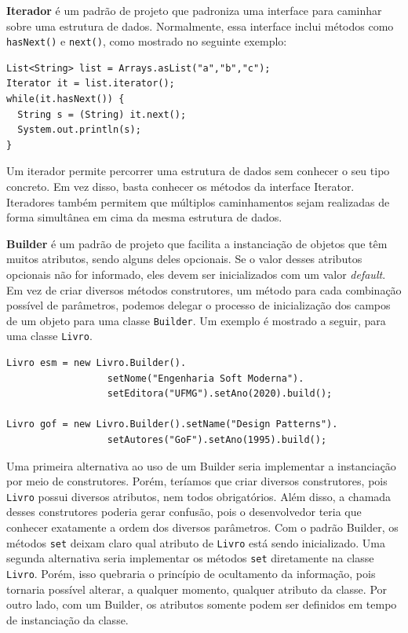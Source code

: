 \documentclass[
  11pt,
  twoside]{book}
\newcommand{\passthrough}[1]{#1}
\begin{document}
\textbf{Iterador} é um padrão de projeto que padroniza uma interface
para caminhar sobre uma estrutura de dados. Normalmente, essa interface
inclui métodos como \passthrough{\lstinline!hasNext()!} e
\passthrough{\lstinline!next()!}, como mostrado no seguinte exemplo:

\newpage

\begin{lstlisting}
List<String> list = Arrays.asList("a","b","c");
Iterator it = list.iterator();
while(it.hasNext()) {
  String s = (String) it.next();
  System.out.println(s);
}
\end{lstlisting}

Um iterador permite percorrer uma estrutura de dados sem conhecer o seu
tipo concreto. Em vez disso, basta conhecer os métodos da interface
Iterator. Iteradores também permitem que múltiplos caminhamentos sejam
realizadas de forma simultânea em cima da mesma estrutura de dados.

 

\textbf{Builder} é um padrão de projeto que facilita a instanciação de
objetos que têm muitos atributos, sendo alguns deles opcionais. Se o
valor desses atributos opcionais não for informado, eles devem ser
inicializados com um valor \emph{default}. Em vez de criar diversos
métodos construtores, um método para cada combinação possível de
parâmetros, podemos delegar o processo de inicialização dos campos de um
objeto para uma classe \passthrough{\lstinline!Builder!}. Um exemplo é
mostrado a seguir, para uma classe \passthrough{\lstinline!Livro!}.

\begin{lstlisting}
Livro esm = new Livro.Builder().
                  setNome("Engenharia Soft Moderna").
                  setEditora("UFMG").setAno(2020).build();

Livro gof = new Livro.Builder().setName("Design Patterns").
                  setAutores("GoF").setAno(1995).build();
\end{lstlisting}

Uma primeira alternativa ao uso de um Builder seria implementar a
instanciação por meio de construtores. Porém, teríamos que criar
diversos construtores, pois \passthrough{\lstinline!Livro!} possui
diversos atributos, nem todos obrigatórios. Além disso, a chamada desses
construtores poderia gerar confusão, pois o desenvolvedor teria que
conhecer exatamente a ordem dos diversos parâmetros. Com o padrão
Builder, os métodos \passthrough{\lstinline!set!} deixam claro qual
atributo de \passthrough{\lstinline!Livro!} está sendo inicializado. Uma
segunda alternativa seria implementar os métodos
\passthrough{\lstinline!set!} diretamente na classe
\passthrough{\lstinline!Livro!}. Porém, isso quebraria o princípio de
ocultamento da informação, pois tornaria possível alterar, a qualquer
momento, qualquer atributo da classe. Por outro lado, com um Builder, os
atributos somente podem ser definidos em tempo de instanciação da
classe.
\end{document}

